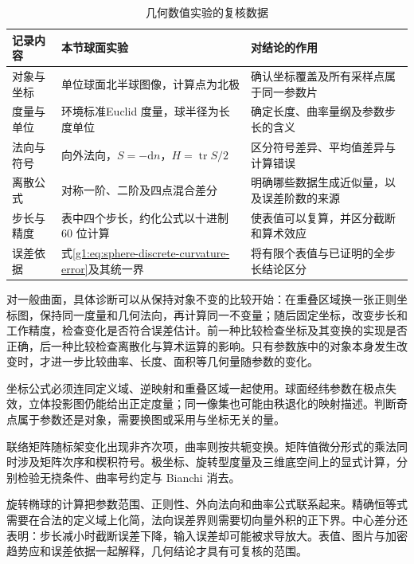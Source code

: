 \begin{table}[htbp]
	\centering
	\caption{几何数值实验的复核数据}
	\label{g1:tab:geometry-experiment-data}
	\begin{tabularx}{\textwidth}{@{}p{}XX@{}}
		\toprule
		记录内容 & 本节球面实验 & 对结论的作用\\
		\midrule
		对象与坐标 & 单位球面北半球图像，计算点为北极 & 确认坐标覆盖及所有采样点属于同一参数片\\
		度量与单位 & 环境标准Euclid 度量，球半径为长度单位 & 确定长度、曲率量纲及参数步长的含义\\
		法向与符号 & 向外法向，\(S=-\mathrm{d}n\)，\(H=\operatorname{tr}S/2\) & 区分符号差异、平均值差异与计算错误\\
		离散公式 & 对称一阶、二阶及四点混合差分 & 明确哪些数据生成近似量，以及误差阶数的来源\\
		步长与精度 & 表中四个步长，约化公式以十进制 \(60\) 位计算 & 使表值可以复算，并区分截断和算术效应\\
		误差依据 & 式\eqref{g1:eq:sphere-discrete-curvature-error}及其统一界 & 将有限个表值与已证明的全步长结论区分\\
		\bottomrule
	\end{tabularx}
\end{table}

对一般曲面，具体诊断可以从保持对象不变的比较开始：在重叠区域换一张正则坐标图，保持同一度量和几何法向，再计算同一不变量；随后固定坐标，改变步长和工作精度，检查变化是否符合误差估计。前一种比较检查坐标及其变换的实现是否正确，后一种比较检查离散化与算术运算的影响。只有参数族中的对象本身发生改变时，才进一步比较曲率、长度、面积等几何量随参数的变化。

\begin{chaptersummary}
	坐标公式必须连同定义域、逆映射和重叠区域一起使用。球面经纬参数在极点失效，立体投影图仍能给出正定度量；同一像集也可能由秩退化的映射描述。判断奇点属于参数还是对象，需要换图或采用与坐标无关的量。

	\ProseParagraphBreak

	联络矩阵随标架变化出现非齐次项，曲率则按共轭变换。矩阵值微分形式的乘法同时涉及矩阵次序和楔积符号。极坐标、旋转型度量及三维底空间上的显式计算，分别检验无挠条件、曲率号约定与 Bianchi 消去。

	\ProseParagraphBreak

	旋转椭球的计算把参数范围、正则性、外向法向和曲率公式联系起来。精确恒等式需要在合法的定义域上化简，法向误差界则需要切向量外积的正下界。中心差分还表明：步长减小时截断误差下降，输入误差却可能被求导放大。表值、图片与加密趋势应和误差依据一起解释，几何结论才具有可复核的范围。
\end{chaptersummary}

